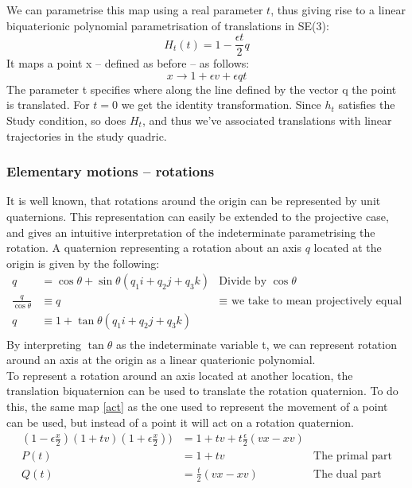 We can parametrise this map using a real parameter $t$, thus giving rise to a linear biquaterionic polynomial parametrisation of translations in SE(3):
\begin{equation}
    H_t(t) = 1 - \frac{\epsilon t}{2}q
\end{equation}
It maps a point x -- defined as before -- as follows:
\begin{equation}
    x \rightarrow  1 + \epsilon v + \epsilon qt
\end{equation}
The parameter t specifies where along the line defined by the vector q the point is translated. For $t = 0$ we get the identity transformation.
Since $h_t$ satisfies the Study condition, so does  $H_t$, and thus we've associated translations with linear trajectories in the study quadric.
\subsubsection{Elementary motions -- rotations}
It is well known, that rotations around the origin can be represented by unit quaternions. This representation can easily be extended to the projective case, and gives an intuitive interpretation of the indeterminate parametrising the rotation. A quaternion representing a rotation about an axis $q$ located at the origin is given by the following:
\begin{equation}
    \begin{aligned}
        q&= \cos{\theta} + \sin{\theta}(q_1\mathit{i} + q_2\mathit{j} + q_3\mathit{k})&\mbox{Divide by $\cos{\theta}$}\\[1.25ex]
        \frac{q}{\cos{\theta}}&\equiv q&\mbox{$\equiv$ we take to mean projectively equal}\\[1.25ex]
        q&\equiv 1 + \tan{\theta}(q_1\mathit{i} + q_2\mathit{j} + q_3\mathit{k})&\mbox{}\\[1.25ex]
    \end{aligned}
\end{equation}
By interpreting $\tan{\theta}$ as the indeterminate variable t, we can represent rotation around an axis at the origin as a linear quaterionic polynomial. \\
To represent a rotation around an axis located at another location, the translation biquaternion can be used to translate the rotation quaternion\cite{Siegele_2021}. To do this, the same map \ref{act} as the one used to represent the movement of a point can be used, but instead of a point it will act on a rotation quaternion. 
\begin{equation}
    \label{rottr}
    \begin{aligned}
        (1-\epsilon \frac{x}{2})(1+tv)(1+\epsilon \frac{x}{2}))   &= 1 + tv +t\frac{\epsilon}{2}(vx-xv)&\mbox{}\\[1.25ex]
        P(t)&= 1 + tv&\mbox{The primal part}\\[1.25ex]
        Q(t)&= \frac{t}{2}(vx-xv)&\mbox{The dual part}\\[1.25ex]
    \end{aligned}
\end{equation}
